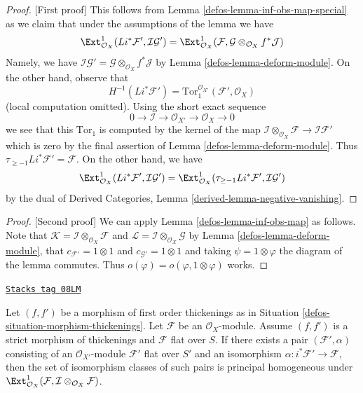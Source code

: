 \begin{proof}
[First proof]
This follows from Lemma \ref{defos-lemma-inf-obs-map-special}
as we claim that under the assumptions of the lemma we have
$$
\Ext^1_{\mathcal{O}_X}(Li^*\mathcal{F}',
\mathcal{I}\mathcal{G}') =
\Ext^1_{\mathcal{O}_X}(\mathcal{F},
\mathcal{G} \otimes_{\mathcal{O}_X} f^*\mathcal{J})
$$
Namely, we have
$\mathcal{I}\mathcal{G}' =
\mathcal{G} \otimes_{\mathcal{O}_X} f^*\mathcal{J}$
by Lemma \ref{defos-lemma-deform-module}.
On the other hand, observe that
$$
H^{-1}(Li^*\mathcal{F}') =
\text{Tor}_1^{\mathcal{O}_{X'}}(\mathcal{F}', \mathcal{O}_X)
$$
(local computation omitted). Using the short exact sequence
$$
0 \to \mathcal{I} \to \mathcal{O}_{X'} \to \mathcal{O}_X \to 0
$$
we see that this $\text{Tor}_1$ is computed by the kernel of the map
$\mathcal{I} \otimes_{\mathcal{O}_X} \mathcal{F} \to \mathcal{I}\mathcal{F}'$
which is zero by the final assertion of Lemma \ref{defos-lemma-deform-module}.
Thus $\tau_{\geq -1}Li^*\mathcal{F}' = \mathcal{F}$.
On the other hand, we have
$$
\Ext^1_{\mathcal{O}_X}(Li^*\mathcal{F}',
\mathcal{I}\mathcal{G}') =
\Ext^1_{\mathcal{O}_X}(\tau_{\geq -1}Li^*\mathcal{F}',
\mathcal{I}\mathcal{G}')
$$
by the dual of
Derived Categories, Lemma \ref{derived-lemma-negative-vanishing}.
\end{proof}

\begin{proof}
[Second proof]
We can apply Lemma \ref{defos-lemma-inf-obs-map} as follows. Note that
$\mathcal{K} = \mathcal{I} \otimes_{\mathcal{O}_X} \mathcal{F}$ and
$\mathcal{L} = \mathcal{I} \otimes_{\mathcal{O}_X} \mathcal{G}$
by Lemma \ref{defos-lemma-deform-module}, that
$c_{\mathcal{F}'} = 1 \otimes 1$ and $c_{\mathcal{G}'} = 1 \otimes 1$
and taking $\psi = 1 \otimes \varphi$ the diagram of the lemma
commutes. Thus $o(\varphi) = o(\varphi, 1 \otimes \varphi)$
works.
\end{proof}

\begin{lemma}
\label{defos-lemma-inf-ext-rel}
\href{https://stacks.math.columbia.edu/tag/08LM}{\texttt{Stacks tag 08LM}}

Let $(f, f')$ be a morphism of first order thickenings as in
Situation \ref{defos-situation-morphism-thickenings}.
Let $\mathcal{F}$ be an $\mathcal{O}_X$-module.
Assume $(f, f')$ is a strict morphism of thickenings and
$\mathcal{F}$ flat over $S$. If there exists a pair
$(\mathcal{F}', \alpha)$ consisting of an
$\mathcal{O}_{X'}$-module $\mathcal{F}'$ flat over $S'$ and an isomorphism
$\alpha : i^*\mathcal{F}' \to \mathcal{F}$, then the set of
isomorphism classes of such pairs is principal homogeneous
under
$\Ext^1_{\mathcal{O}_X}(
\mathcal{F}, \mathcal{I} \otimes_{\mathcal{O}_X} \mathcal{F})$.
\end{lemma}

